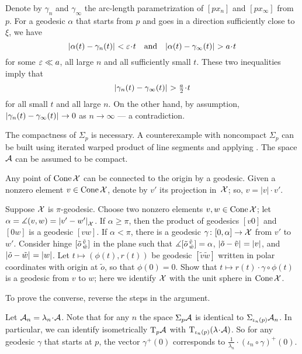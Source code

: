 Denote by $\gamma_n$ and $\gamma_\infty$ the arc-length parametrization of $[px_n]$ and $[px_\infty]$ from $p$.
For a  geodesic $\alpha$ that starts from $p$ and goes in a direction sufficiently close to $\xi$, we have
\[\dist{\alpha(t)}{\gamma_n(t)}{}<\eps\cdot t
\quad\text{and}\quad
\dist{\alpha(t)}{\gamma_\infty(t)}{}>a\cdot t
\]
for some $\varepsilon \ll a$, all large $n$ and all sufficiently small $t$.
These two inequalities imply 
that 
\[\dist{\gamma_n(t)}{\gamma_\infty(t)}{}>\tfrac a2\cdot t\]
for all small $t$ and all large $n$.
On the other hand, by assumption, $|{\gamma_n(t)}-{\gamma_\infty(t)}|_{}^{{}}\to0$ as $n\to\infty$ --- a contradiction.

The compactness of $\Sigma_p$ is necessary.
A counterexample with noncompact  $\Sigma_p$ can be built using iterated warped product of line segments and applying \cite[Theorem 1.2]{alexander-bishop2004}.
The space $\mathcal{A}$ can be assumed to be compact.


Any point of $\mathop{\rm Cone}\nolimits \mathcal{X}$ can be connected to the origin by a geodesic.
Given a nonzero element $v\in\mathop{\rm Cone}\nolimits \mathcal{X}$, denote by $v'$ its projection in~$\mathcal{X}$; so, $v=|v|\cdot v'$.

Suppose $\mathcal{X}$ is $\pi$-geodesic.
Choose two nonzero elements $v,w\in\mathop{\rm Cone}\nolimits \mathcal{X}$; let $\alpha=\measuredangle(v,w)=|{v'}-{w'}|_{\mathcal{X}}^{{}}$.
If $\alpha\ge \pi$, then the product of geodesics $[v0]$ and $[0w]$ is a geodesic $[vw]$.
If $\alpha<\pi$, there is a geodesic $\gamma\colon[0,\alpha]\to \mathcal{X}$ from $v'$ to $w'$.
Consider hinge $[\tilde o\,{}^{\tilde v}_{\tilde w}]$ in the plane 
such that $\measuredangle[\tilde o\,{}^{\tilde v}_{\tilde w}]=\alpha$, $|{\tilde o}-{\tilde v}|_{}^{{}}=|v|$, and $|{\tilde o}-{\tilde w}|_{}^{{}}=|w|$.
Let $t\mapsto (\phi(t),r(t))$ be geodesic $[\tilde v\tilde w]$ written in polar coordinates with origin at $\tilde o$, so that $\phi(0)=0$.
Show that $t\mapsto r(t)\cdot\gamma\circ\phi(t)$ is a geodesic from $v$ to $w$;
here we identify $\mathcal{X}$ with the unit sphere in $\mathop{\rm Cone}\nolimits \mathcal{X}$.

To prove the converse, reverse the steps in the argument.

Let  $\spc{A}_n=\lambda_n\cdot\spc{A}$.
Note that for any $n$ the space $\Sigma_p\mathcal{A}$ is identical to $\Sigma_{\iota_n(p)} \mathcal{A}_n$.
In particular, we can identify isometrically $\mathrm{T}_p\mathcal{A}$ with $\T_{\iota_n(p)}(\lambda\cdot \spc{A})$.
So for any geodesic $\gamma$ that starts at $p$, the vector $\gamma^+(0)$ corresponds to $\frac{1}{\lambda_n}\cdot(\iota_n\circ\gamma)^+(0)$.

